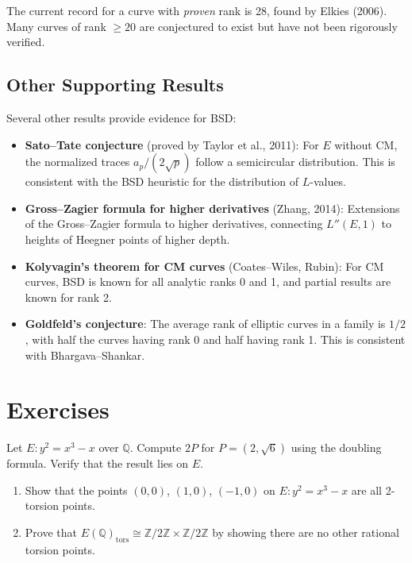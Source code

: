 The current record for a curve with \emph{proven} rank is 28, found by Elkies (2006). Many curves of rank $\ge 20$ are conjectured to exist but have not been rigorously verified.

\subsection{Other Supporting Results}

Several other results provide evidence for BSD:

\begin{itemize}
\item \textbf{Sato--Tate conjecture} (proved by Taylor et al., 2011): For $E$ without CM, the normalized traces $a_p / (2\sqrt{p})$ follow a semicircular distribution. This is consistent with the BSD heuristic for the distribution of $L$-values.
\item \textbf{Gross--Zagier formula for higher derivatives} (Zhang, 2014): Extensions of the Gross--Zagier formula to higher derivatives, connecting $L''(E, 1)$ to heights of Heegner points of higher depth.
\item \textbf{Kolyvagin's theorem for CM curves} (Coates--Wiles, Rubin): For CM curves, BSD is known for all analytic ranks 0 and 1, and partial results are known for rank 2.
\item \textbf{Goldfeld's conjecture}: The average rank of elliptic curves in a family is $1/2$, with half the curves having rank 0 and half having rank 1. This is consistent with Bhargava--Shankar.
\end{itemize}

\section{Exercises}

\begin{exercise}
Let $E: y^2 = x^3 - x$ over $\mathbb{Q}$. Compute $2P$ for $P = (2, \sqrt{6})$ using the doubling formula. Verify that the result lies on $E$.
\end{exercise}

\begin{exercise}
\begin{enumerate}
\item Show that the points $(0,0)$, $(1,0)$, $(-1,0)$ on $E: y^2 = x^3 - x$ are all 2-torsion points.
\item Prove that $E(\mathbb{Q})_{\mathrm{tors}} \cong \mathbb{Z}/2\mathbb{Z} \times \mathbb{Z}/2\mathbb{Z}$ by showing there are no other rational torsion points.
\end{enumerate}
\end{exercise}

